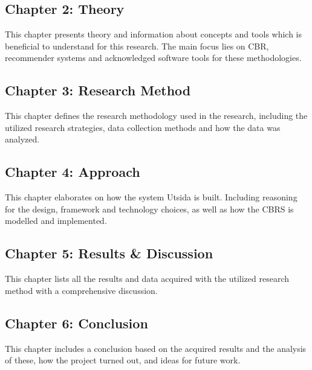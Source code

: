 \subsection*{Chapter 2: Theory}
This chapter presents theory and information about concepts and tools which is beneficial to understand for this research. The main focus lies on CBR, recommender systems and acknowledged software tools for these methodologies. 

\subsection*{Chapter 3: Research Method}
This chapter defines the research methodology used in the research, including the utilized research strategies, data collection methods and how the data was analyzed. 
\subsection*{Chapter 4: Approach}
This chapter elaborates on how the system Utsida is built. Including reasoning for the design, framework and technology choices, as well as how the CBRS is modelled and implemented.

\subsection*{Chapter 5: Results \& Discussion}
This chapter lists all the results and data acquired with the utilized research method with a comprehensive discussion.

\subsection*{Chapter 6: Conclusion}
This chapter includes a conclusion based on the acquired results and the analysis of these, how the project turned out, and ideas for future work.

\cleardoublepage